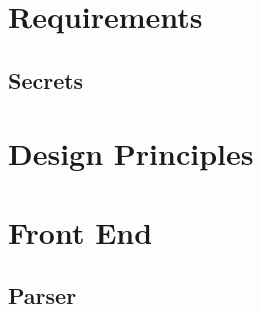 \documentclass[12pt]{amsart}
\title{}
\author{Simon Hudon}
\date{} %
\begin{document}
\maketitle
\tableofcontents

\section{Requirements}
\subsection{Secrets}
\section{Design Principles}
\section{Front End}


\subsection{Parser}
\end{document}
